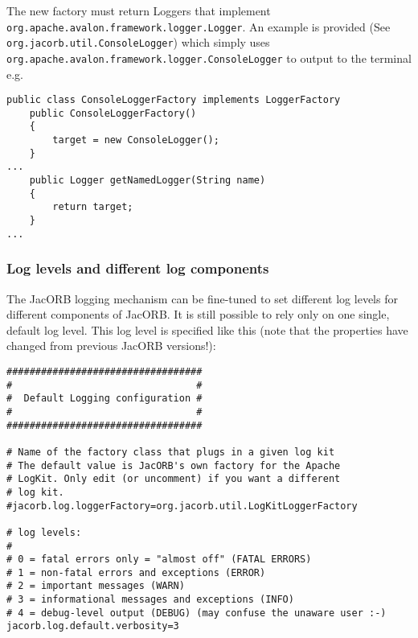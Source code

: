 {{The new factory must return Loggers that implement
{\tt org.apache.avalon.framework.logger.Logger}. An example is provided (See
{\tt org.jacorb.util.ConsoleLogger}) which simply uses
{\tt org.apache.avalon.framework.logger.ConsoleLogger} to output to the terminal e.g.
\begin{small}
\begin{verbatim}
public class ConsoleLoggerFactory implements LoggerFactory
    public ConsoleLoggerFactory()
    {
        target = new ConsoleLogger();
    }
...
    public Logger getNamedLogger(String name)
    {
        return target;
    }
...
\end{verbatim}
\end{small}

\subsubsection*{Log levels and different log components}

The JacORB logging mechanism can be fine-tuned to set different log
levels for different components of JacORB. It is still possible to
rely only on one single, default log level. This log level is
specified like this (note that the properties have changed from
previous JacORB versions!):

\renewcommand{\baselinestretch}{0.9}
\small{
\begin{verbatim}
##################################
#                                #
#  Default Logging configuration #
#                                #
##################################

# Name of the factory class that plugs in a given log kit
# The default value is JacORB's own factory for the Apache
# LogKit. Only edit (or uncomment) if you want a different
# log kit.
#jacorb.log.loggerFactory=org.jacorb.util.LogKitLoggerFactory

# log levels:
#
# 0 = fatal errors only = "almost off" (FATAL ERRORS)
# 1 = non-fatal errors and exceptions (ERROR)
# 2 = important messages (WARN)
# 3 = informational messages and exceptions (INFO)
# 4 = debug-level output (DEBUG) (may confuse the unaware user :-)
jacorb.log.default.verbosity=3
\end{verbatim}
}
\renewcommand{\baselinestretch}{1.0}
\small\normalsize

}}
